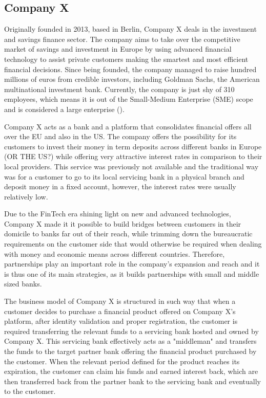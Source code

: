 \documentclass[11pt,a4paper]{article}
\begin{document}
{{\subsection{Company X}
Originally founded in 2013, based in Berlin, Company X deals in the investment and savings finance sector. The company aims to take over the competitive market of savings and investment in Europe by using advanced financial technology to assist private customers making the smartest and most efficient financial decisions. Since being founded, the company managed to raise hundred millions of euros from credible investors, including Goldman Sachs, the American multinational investment bank. Currently, the company is just shy of 310 employees, which means it is out of the Small-Medium Enterprise (SME) scope and is considered a large enterprise (\cite{majocchiFirmSizeBusiness2005}).
 \par Company X acts as a bank and a platform that consolidates financial offers all over the EU and also in the US. The company offers the possibility for its customers to invest their money in term deposits across different banks in Europe (OR THE US?) while offering very attractive interest rates in comparison to their local providers. This service was previously not available and the traditional way was for a customer to go to its local servicing bank in a physical branch and deposit money in a fixed account, however, the interest rates were usually relatively low. \par 
Due to the FinTech era shining light on new and advanced technologies, Company X made it it possible to build bridges between customers in their domicile to banks far out of their reach, while trimming down the bureaucratic requirements on the customer side that would otherwise be required when dealing with money and economic means across different countries. Therefore, partnerships play an important role in the company's expansion and reach and it is thus one of its main strategies, as it builds partnerships with small and middle sized banks.  \par
The business model of Company X is structured in such way that when a customer decides to purchase a financial product offered on Company X's platform, after identity validation and proper registration, the customer is required transferring the relevant funds to a servicing bank hosted and owned by Company X. This servicing bank effectively acts as a "middleman" and transfers the funds to the target partner bank offering the financial product purchased by the customer. When the relevant period defined for the product reaches its expiration, the customer can claim his funds and earned interest back, which are then transferred back from the partner bank to the servicing bank and eventually to the customer. \par 
}}
\end{document}
